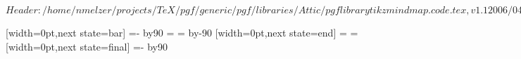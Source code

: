 \ProvidesPackageRCS[v\pgfversion] $Header: /home/nmelzer/projects/TeX/pgf/generic/pgf/libraries/Attic/pgflibrarytikzmindmap.code.tex,v 1.1 2006/04/24 20:10:33 tantau Exp $

%




%

{
  [width=0pt,next state=bar]
  {
    {
    \pgftransformxshift{-1pt}%
    \pgftransformxshift{-\pgfsnakecirclestartradius}%
    \pgfpathmoveto{\pgfpointpolar{\pgfsnakesegmentangle}{\pgfsnakecirclestartradius}}
    \pgfpatharc{\pgfsnakesegmentangle}{-\pgfsnakesegmentangle}{\pgfsnakecirclestartradius}
    \@tempcnta=-\pgfsnakesegmentangle\relax
    \advance\@tempcnta by90\relax
    \@tempdima=\pgfsnakecirclestartradius\relax
    \pgfpathcurveto
    {\pgfpointadd
      {\pgfpointpolar{-\pgfsnakesegmentangle}{\pgfsnakecirclestartradius}}
      {}}
    {}
    {}
    \@tempcnta=\pgfsnakesegmentangle\relax
    \advance\@tempcnta by-90\relax
    \pgfpathcurveto
    {}
    {\pgfpointadd
      {\pgfpointpolar{\pgfsnakesegmentangle}{\pgfsnakecirclestartradius}}
      {}}
    {\pgfpointpolar{\pgfsnakesegmentangle}{\pgfsnakecirclestartradius}}
    \pgfpathclose
    }
  }
  [width=0pt,next state=end]
  {
    \@tempdima=\pgfsnakecirclestartradius\relax
    \@tempdimb=\pgfsnakecircleendradius\relax
    \pgfpathrectangle
    {}
    {}
  }
  [width=0pt,next state=final]
  {
    {
    \pgftransformxshift{\pgfsnakeremainingdistance}%
    \pgftransformxshift{1pt}%
    \pgftransformxshift{-\pgfsnakecircleendradius}%
    \pgfpathmoveto{\pgfpointpolar{\pgfsnakesegmentangle}{\pgfsnakecircleendradius}}
    \pgfpatharc{\pgfsnakesegmentangle}{-\pgfsnakesegmentangle}{\pgfsnakecircleendradius}
    \@tempcnta=-\pgfsnakesegmentangle\relax
    \advance\@tempcnta by90\relax
}}}
